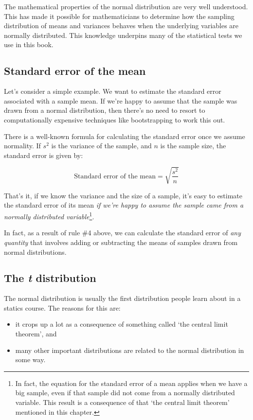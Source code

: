 \documentclass[
]{book}
\providecommand{\tightlist}{%
  \setlength{\itemsep}{0pt}\setlength{\parskip}{0pt}}
\begin{document}
The mathematical properties of the normal distribution are very well understood. This has made it possible for mathematicians to determine how the sampling distribution of means and variances behaves when the underlying variables are normally distributed. This knowledge underpins many of the statistical tests we use in this book.

\hypertarget{standard-error-of-the-mean}{%
\subsection{Standard error of the mean}\label{standard-error-of-the-mean}}

Let's consider a simple example. We want to estimate the standard error associated with a sample mean. If we're happy to assume that the sample was drawn from a normal distribution, then there's no need to resort to computationally expensive techniques like bootstrapping to work this out.

There is a well-known formula for calculating the standard error once we assume normality. If \(s^2\) is the variance of the sample, and \(n\) is the sample size, the standard error is given by:

\[\text{Standard error of the mean} = \sqrt{\frac{s^2}{n}}\]

That's it, if we know the variance and the size of a sample, it's easy to estimate the standard error of its mean \emph{if we're happy to assume the sample came from a normally distributed variable}\footnote{In fact, the equation for the standard error of a mean applies when we have a big sample, even if that sample did not come from a normally distributed variable. This result is a consequence of that `the central limit theorem' mentioned in this chapter.}.

In fact, as a result of rule \#4 above, we can calculate the standard error of \emph{any quantity} that involves adding or subtracting the means of samples drawn from normal distributions.

\hypertarget{the-t-distribution}{%
\subsection{\texorpdfstring{The \emph{t} distribution}{The t distribution}}\label{the-t-distribution}}

The normal distribution is usually the first distribution people learn about in a statics course. The reasons for this are:

\begin{itemize}
\tightlist
\item
  it crops up a lot as a consequence of something called `the central limit theorem', and
\item
  many other important distributions are related to the normal distribution in some way.
\end{itemize}
\end{document}
